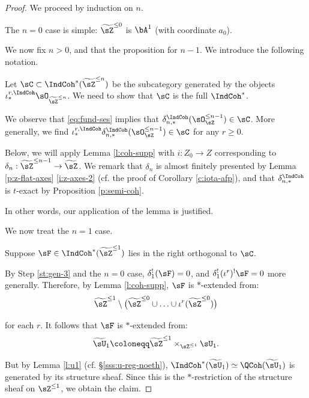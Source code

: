 \begin{proof}

We proceed by induction on $n$.

\step

The $n = 0$ case is simple: $\widetilde{\sZ}^{\leq 0}$ is $\bA^1$ (with coordinate
$a_0$).

\step

We now fix $n > 0$, and that the proposition for $n - 1$.
We introduce the following notation.

Let $\sC \subset \IndCoh^*(\widetilde{\sZ}^{\leq n})$ be the subcategory generated
by the objects $\iota_*^{r,\IndCoh}\sO_{\widetilde{\sZ}^{\leq n}}$. We need
to show that $\sC$ is the full $\IndCoh^*$.

\step \label{st:gen-3}

We observe that \eqref{eq:fund-ses} implies that
$\delta_{n,*}^{\IndCoh}(\sO_{\sZ}^{\leq n-1}) \in \sC$.
More generally, we find
$\iota_*^{r,\IndCoh}\delta_{n,*}^{\IndCoh}(\sO_{\sZ}^{\leq n-1}) \in \sC$ for
any $r\geq 0$.

\step

Below, we will apply Lemma \ref{l:coh-supp} with
$i:Z_0 \to Z$ corresponding to
$\delta_n:\widetilde{\sZ}^{\leq n-1} \to \widetilde{\sZ}$. We remark
that $\delta_n$ is almost finitely presented by
Lemma \ref{p:z-flat-axes} \eqref{i:z-axes-2}
(cf. the proof of Corollary \ref{c:iota-afp}), and that $\delta_{n,*}^{\IndCoh}$
is $t$-exact by Proposition \ref{p:semi-coh}.

In other words, our application of the lemma is justified.

\step

We now treat the $n = 1$ case.

Suppose $\sF \in \IndCoh^*(\widetilde{\sZ}^{\leq 1})$ lies in the
right orthogonal to $\sC$.

By Step \ref{st:gen-3} and the $n = 0$ case, $\delta_1^!(\sF) = 0$, and
$\delta_1^!(\iota^r)^! \sF = 0$ more generally. Therefore,
by Lemma \ref{l:coh-supp}, $\sF$ is $*$-extended from:
%
\[
\widetilde{\sZ}^{\leq 1} \setminus
\big(\widetilde{\sZ}^{\leq 0} \cup \ldots \cup \iota^r(\widetilde{\sZ}^{\leq 0})\big)
\]

 for each $r$. It follows that $\sF$ is $*$-extended from:
%
\[
\widetilde{\sU}_1 \coloneqq
\widetilde{\sZ}^{\leq 1} \times_{\sZ^{\leq 1}} \sU_1.
\]

But by Lemma \ref{l:u1} (cf. \S \ref{sss:u-reg-noeth}),
$\IndCoh^*(\widetilde{\sU}_1) \simeq \QCoh(\widetilde{\sU}_1)$
is generated by its structure sheaf. Since this is the $*$-restriction
of the structure sheaf on $\sZ^{\leq 1}$, we obtain the claim.


\end{proof}
